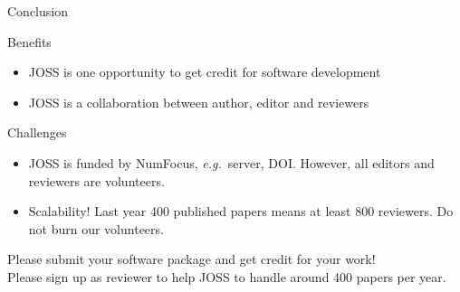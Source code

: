 \documentclass{beamer}
\begin{document}
\begin{frame}{Conclusion}

\begin{block}{Benefits }
    \begin{itemize}
        \item JOSS is one opportunity to get credit for software development
        \item JOSS is a collaboration between author, editor and reviewers
    \end{itemize}
\end{block}

\begin{block}{Challenges }
        \begin{itemize}
            \item  JOSS is funded by NumFocus, \emph{e.g.}\ server, DOI. However, all editors and reviewers are volunteers.
            \item Scalability! Last year 400 published papers means at least 800 reviewers. Do not burn our volunteers.
        \end{itemize}
\end{block}
\begin{center}
    Please submit your software package and get credit for your work! \\
    Please sign up as reviewer to help JOSS to handle around 400 papers per year.
\end{center}

\tiny \doclicenseThis
\end{frame}
\end{document}
